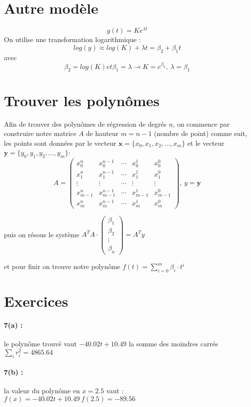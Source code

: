 \documentclass[a4paper,9pt]{extarticle}
\begin{document}
\section{Autre modèle}
$$y(t) = Ke^{\lambda t}$$
On utilise une transformation logarithmique :
$$
log(y) \approx log(K) + \lambda t = \beta_2 + \beta_1 t
$$
avec
$$
\beta_2 = log(K) et \beta_1 = \lambda \longrightarrow K = e^{\beta_2}, \ \lambda = \beta_1
$$

\section{Trouver les polynômes}

Afin de trouver des polynômes de régression de degrés $n$, on commence par construire notre matrice $A$ de hauteur $m=n-1$ (nombre de point) comme suit, les points sont données par le vecteur $\textbf{x} = \{x_0,x_1,x_2,...,x_m\}$ et le vecteur $\textbf{y}=\{y_0,y_1,y_2,...,y_m\}$:
$$A = 
\begin{pmatrix}
x_0^n & x_0^{n-1} & \cdots & x_0^1 & x_0^0 \\
x_1^n & x_1^{n-1} & \cdots & x_1^1 & x_1^0 \\
\vdots & \vdots & \cdots & \vdots & \vdots \\
x_{m-1}^n & x_{m-1}^{n-1} & \cdots & x_{m-1}^1 & x_{m-1}^0 \\
x_m^n & x_m^{n-1} & \cdots & x_m^1 & x_m^0
\end{pmatrix}
,\
y = \textbf{y}
$$

puis on résous le système $A^T A \cdot \begin{pmatrix}\beta_1 \\ \beta_2 \\ \vdots \\ \beta_n\end{pmatrix} = A^Ty$

et pour finir on trouve notre polynôme $f(t)=\sum_{i=0}^m \beta_i \cdot t^i$


\section{Exercices}

\paragraph*{7(a) : } le polynôme trouvé vaut $-40.02t+10.49$ la somme des moindres carrés $\sum_ir^2_i = 4865.64$

\paragraph*{7(b) : } la valeur du polynôme en $x=2.5$ vaut : $f(x)=-40.02t+10.49 \ f(2.5)=-89.56$
\end{document}
